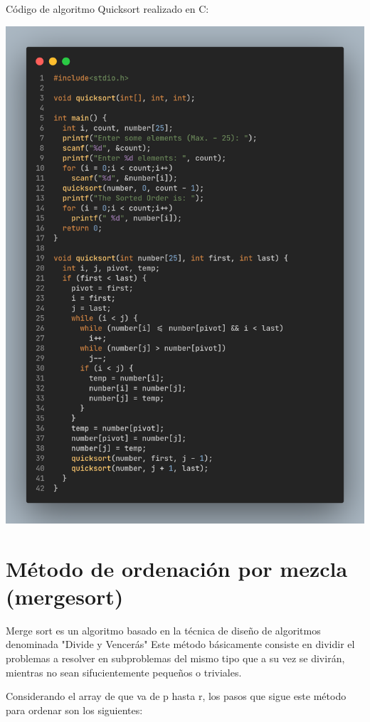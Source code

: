 \documentclass[letterpaper, 12pt]{article}
\begin{document}
  \newpage
  Código de algoritmo Quicksort realizado en C:
  \begin{center}
    \includegraphics[width=.9\textwidth]{src/img/qksort.png}
  \end{center}

  {\centering\section*{\LARGE Método de ordenación por mezcla (mergesort)}\vspace{1cm}}
  Merge sort es un algoritmo basado en la técnica de diseño de algoritmos denominada "Divide y Vencerás"
  Este método básicamente consiste en dividir el problemas a resolver en subproblemas del mismo tipo que a su vez
  se divirán, mientras no sean sifucientemente pequeños o triviales.

  Considerando el array de que va de p hasta r, los pasos que sigue este método para ordenar son los siguientes:
\end{document}
